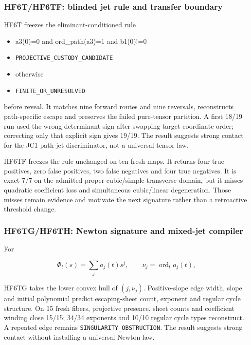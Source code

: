\subsubsection{HF6T/HF6TF: blinded jet rule and transfer
boundary}\label{viii-ch11-hf6thf6tf-blinded-jet-rule-and-transfer-boundary}

HF6T freezes the eliminant-conditioned rule

\begin{itemize}
\tightlist
\item
  a3(0)=0 and ord\_path(a3)=1 and b1(0)!=0
\item
  \nolinkurl{PROJECTIVE_CUSTODY_CANDIDATE}
\item
  otherwise
\item
  \nolinkurl{FINITE_OR_UNRESOLVED}
\end{itemize}

before reveal. It matches nine forward routes and nine reversals,
reconstructs path-specific escape and preserves the failed pure-tensor
partition. A first 18/19 run used the wrong determinant sign after
swapping target coordinate order; correcting only that explicit sign
gives 19/19. The result suggests strong contact for the JC1 path-jet
discriminator, not a universal tensor law.

HF6TF freezes the rule unchanged on ten fresh maps. It returns four true
positives, zero false positives, two false negatives and four true
negatives. It is exact 7/7 on the admitted
proper-cubic/simple-transverse domain, but it misses quadratic
coefficient loss and simultaneous cubic/linear degeneration. Those
misses remain evidence and motivate the next signature rather than a
retroactive threshold change.

\subsubsection{HF6TG/HF6TH: Newton signature and mixed-jet
compiler}\label{viii-ch11-hf6tghf6th-newton-signature-and-mixed-jet-compiler}

For

\[
\Phi_t(s)=\sum_j a_j(t)s^j,
\qquad
\nu_j=\operatorname{ord}_t a_j(t),
\]

HF6TG takes the lower convex hull of \((j,\nu_j)\). Positive-slope edge
width, slope and initial polynomial predict escaping-sheet count,
exponent and regular cycle structure. On 15 fresh fibers, projective
presence, sheet counts and coefficient winding close 15/15; 34/34
exponents and 10/10 regular cycle types reconstruct. A repeated edge
remains \texttt{SINGULARITY\_OBSTRUCTION}. The result suggests strong
contact without installing a universal Newton law.

